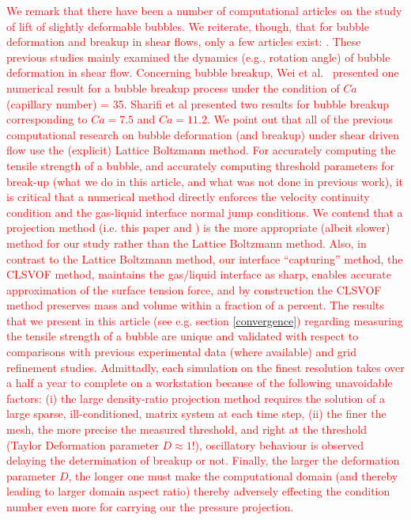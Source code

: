 \documentclass{elsarticle}
\begin{document}
\par
\textcolor{red} {
	We remark that there have been a number of computational articles on the study of lift of slightly deformable bubbles\cite{ErvinANDTryggvason1997,legendre1998lift}.  We reiterate, though, that for bubble deformation and breakup in shear flows, only a few articles exist: \cite{WeiQiaXu12,WanShiZha15,AAMM-16-2}.  These previous studies mainly examined the dynamics (e.g., rotation angle) of bubble deformation in shear flow.  Concerning bubble breakup, Wei et al.~\cite{WeiQiaXu12} presented one numerical result for a bubble breakup process under the condition of $Ca$ (capillary number) = 35. Sharifi et al\cite{AAMM-16-2} presented two results for bubble breakup corresponding to $Ca=7.5$ and $Ca=11.2$.  We point out that all of the previous computational research on bubble deformation (and breakup) under shear driven flow\cite{WeiQiaXu12,WanShiZha15,AAMM-16-2} use the (explicit) Lattice Boltzmann method.  For accurately computing the tensile strength of a bubble, and accurately computing threshold parameters for break-up (what we do in this article, and what was not done in previous work), it is critical that a numerical method directly enforces the velocity continuity condition and the gas-liquid interface normal jump conditions.  We contend that a projection method (i.e. this paper and \cite{zhang2021three,zhang2022three,OhtSus12}) is the more appropriate (albeit slower) method for our study rather than the Lattice Boltzmann method.  Also, in contrast to the Lattice Boltzmann method, our interface ``capturing'' method, the CLSVOF method\cite{SusPuc00,SusSmiHusOhtZhi07}, maintains the gas/liquid interface as sharp, enables accurate approximation of the surface tension force,  and by construction the CLSVOF method preserves mass and volume within a fraction of a percent. The results that we present in this article (see e.g. section \ref{convergence}) regarding measuring the tensile strength of a bubble are unique and validated with respect to comparisons with previous experimental data (where available) and grid refinement studies.  Admittadly, each simulation on the finest resolution takes over a half a year to complete on a workstation because of the following unavoidable factors: (i) the large density-ratio projection method requires the solution of a large sparse, ill-conditioned, matrix system at each time step, (ii) the finer the mesh, the more precise the measured threshold, and right at the threshold (Taylor Deformation parameter $D\approx 1$!), oscillatory behaviour is observed delaying the determination of breakup or not.  Finally, the larger the deformation parameter $D$, the longer one must make the computational domain (and thereby leading to larger domain aspect ratio) thereby adversely effecting the condition number even more for carrying our the pressure projection. 
}
\end{document}
